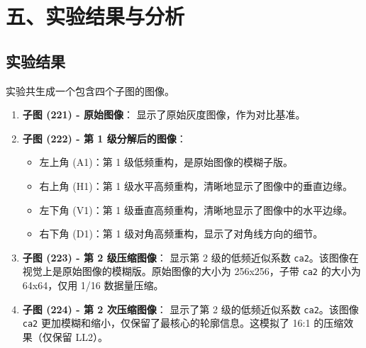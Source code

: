 \documentclass[12pt, a4paper]{article}
\begin{document}
\section*{\centering 五、实验结果与分析}
\subsection*{\centering 实验结果}
实验共生成一个包含四个子图的图像。
\begin{enumerate}
    \item \textbf{子图 (221) - 原始图像}： 显示了原始灰度图像，作为对比基准。
    \item \textbf{子图 (222) - 第 1 级分解后的图像}：
    \begin{itemize}
        \item 左上角 (A1)：第 1 级低频重构，是原始图像的模糊子版。
        \item 右上角 (H1)：第 1 级水平高频重构，清晰地显示了图像中的垂直边缘。
        \item 左下角 (V1)：第 1 级垂直高频重构，清晰地显示了图像中的水平边缘。
        \item 右下角 (D1)：第 1 级对角高频重构，显示了对角线方向的细节。
    \end{itemize}
    \item \textbf{子图 (223) - 第 2 级压缩图像}： 显示第 2 级的低频近似系数 \texttt{ca2}。该图像在视觉上是原始图像的模糊版。原始图像的大小为 256x256，子带 \texttt{ca2} 的大小为 64x64，仅用 1/16 数据量压缩。
    \item \textbf{子图 (224) - 第 2 次压缩图像}： 显示了第 2 级的低频近似系数 \texttt{ca2}。该图像 \texttt{ca2} 更加模糊和缩小，仅保留了最核心的轮廓信息。这模拟了 16:1 的压缩效果（仅保留 LL2）。
\end{enumerate}
\end{document}
